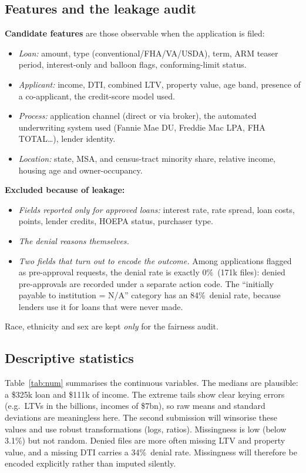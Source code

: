 \documentclass[11pt,a4paper]{article}
\newcommand{\pct}{\%}
\begin{document}
\subsection{Features and the leakage audit}\label{sec:leak}
\textbf{Candidate features} are those observable when the application is filed:
\begin{itemize}
  \item \emph{Loan:} amount, type (conventional/FHA/VA/USDA), term, ARM teaser
  period, interest-only and balloon flags, conforming-limit status.
  \item \emph{Applicant:} income, DTI, combined LTV, property value, age band,
  presence of a co-applicant, the credit-score model used.
  \item \emph{Process:} application channel (direct or via broker), the automated
  underwriting system used (Fannie Mae DU, Freddie Mac LPA, FHA TOTAL\ldots), lender
  identity.
  \item \emph{Location:} state, MSA, and census-tract minority share, relative
  income, housing age and owner-occupancy.
\end{itemize}

\textbf{Excluded because of leakage:}
\begin{itemize}
  \item \emph{Fields reported only for approved loans:} interest rate, rate spread,
  loan costs, points, lender credits, HOEPA status, purchaser type.
  \item \emph{The denial reasons themselves.}
  \item \emph{Two fields that turn out to encode the outcome.} Among applications
  flagged as pre-approval requests, the denial rate is exactly 0\pct\ (171k files):
  denied pre-approvals are recorded under a separate action code. The
  ``initially payable to institution = N/A'' category has an 84\pct\ denial rate,
  because lenders use it for loans that were never made.
\end{itemize}
Race, ethnicity and sex are kept \emph{only} for the fairness audit.

\subsection{Descriptive statistics}
Table~\ref{tab:num} summarises the continuous variables. The medians are plausible:
a \$325k loan and \$111k of income. The extreme tails show clear keying errors
(e.g.\ LTVs in the billions, incomes of \$7bn), so raw means and standard deviations
are meaningless here. The second submission will winsorise these values and use
robust transformations (logs, ratios). Missingness is low (below 3.1\pct) but not
random. Denied files are more often missing LTV and property value, and a missing DTI
carries a 34\pct\ denial rate. Missingness will therefore be encoded explicitly
rather than imputed silently.
\end{document}
